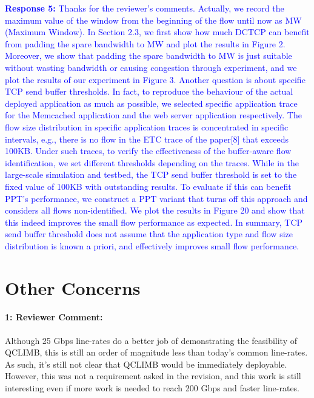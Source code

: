 \documentclass[12pt,one-column]{article}
\begin{document}
\noindent\textcolor{blue}{\textbf{Response 5:}
Thanks for the reviewer’s comments. 
Actually, we record the maximum value of the window from the beginning of the flow until now as MW (Maximum Window).
In Section 2.3, we first show how much DCTCP can benefit from padding the spare bandwidth to MW and plot the results in Figure 2.
Moreover, we show that padding the spare bandwidth to MW is just suitable without wasting bandwidth or causing congestion through experiment, and we plot the results of our experiment in Figure 3.
Another question is about specific TCP send buffer thresholds.
In fact, to reproduce the behaviour of the actual deployed application as much as possible, we selected specific application trace for the Memcached application and the web server application respectively.
The flow size distribution in specific application traces is concentrated in specific intervals, e.g., there is no flow in the ETC trace of the paper[8] that exceeds 100KB.
Under such traces, to verify the effectiveness of the buffer-aware flow identification, we set different thresholds depending on the traces.
While in the large-scale simulation and testbed, the TCP send buffer threshold is set to the fixed value of 100KB with outstanding results.
To evaluate if this can benefit PPT’s performance, we construct a PPT variant that turns off this approach and considers all flows non-identified.
We plot the results in Figure 20 and show that this indeed improves the small flow performance as expected.
In summary, TCP send buffer threshold does not assume that the application type and flow size distribution is known a priori, and effectively improves small flow performance.
}
	
\section{Other Concerns}
{\it \paragraph{1: Reviewer Comment:} Although 25 Gbps line-rates do a better job of demonstrating the feasibility of QCLIMB, this is still an order of magnitude less than today's common line-rates. As such, it's still not clear that QCLIMB would be immediately deployable. However, this was not a requirement asked in the revision, and this work is still interesting even if more work is needed to reach 200 Gbps and faster line-rates. }
\end{document}
